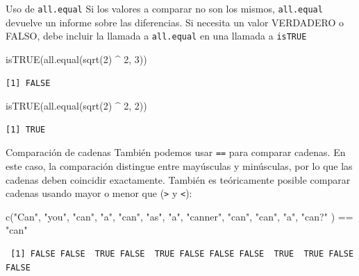 \documentclass[
  ignorenonframetext,
  aspectratio=169,
  spanish,
]{beamer}
\newenvironment{Shaded}{\begin{snugshade}}{\end{snugshade}}
\newcommand{\DecValTok}[1]{\textcolor[rgb]{0.68,0.00,0.00}{#1}}
\newcommand{\FunctionTok}[1]{\textcolor[rgb]{0.28,0.35,0.67}{#1}}
\newcommand{\NormalTok}[1]{\textcolor[rgb]{0.00,0.23,0.31}{#1}}
\newcommand{\SpecialCharTok}[1]{\textcolor[rgb]{0.37,0.37,0.37}{#1}}
\newcommand{\StringTok}[1]{\textcolor[rgb]{0.13,0.47,0.30}{#1}}
\begin{document}
\begin{frame}[fragile]{Uso de \texttt{all.equal}}
\label{uso-de-all.equal}
Si los valores a comparar no son los mismos, \texttt{all.equal} devuelve
un informe sobre las diferencias. Si necesita un valor VERDADERO o
FALSO, debe incluir la llamada a \texttt{all.equal} en una llamada a
\texttt{isTRUE}

\begin{Shaded}
\begin{Highlighting}[]
\FunctionTok{isTRUE}\NormalTok{(}\FunctionTok{all.equal}\NormalTok{(}\FunctionTok{sqrt}\NormalTok{(}\DecValTok{2}\NormalTok{) }\SpecialCharTok{\^{}} \DecValTok{2}\NormalTok{, }\DecValTok{3}\NormalTok{))}
\end{Highlighting}
\end{Shaded}

\begin{verbatim}
[1] FALSE
\end{verbatim}

\begin{Shaded}
\begin{Highlighting}[]
\FunctionTok{isTRUE}\NormalTok{(}\FunctionTok{all.equal}\NormalTok{(}\FunctionTok{sqrt}\NormalTok{(}\DecValTok{2}\NormalTok{) }\SpecialCharTok{\^{}} \DecValTok{2}\NormalTok{, }\DecValTok{2}\NormalTok{))}
\end{Highlighting}
\end{Shaded}

\begin{verbatim}
[1] TRUE
\end{verbatim}
\end{frame}

\begin{frame}[fragile]{Comparación de cadenas}
\label{comparaciuxf3n-de-cadenas}
También podemos usar \texttt{==} para comparar cadenas. En este caso, la
comparación distingue entre mayúsculas y minúsculas, por lo que las
cadenas deben coincidir exactamente. También es teóricamente posible
comparar cadenas usando mayor o menor que (\texttt{\textgreater{}} y
\texttt{\textless{}}):

\begin{Shaded}
\begin{Highlighting}[]
\FunctionTok{c}\NormalTok{(}\StringTok{"Can"}\NormalTok{, }\StringTok{"you"}\NormalTok{, }\StringTok{"can"}\NormalTok{, }\StringTok{"a"}\NormalTok{, }\StringTok{"can"}\NormalTok{, }\StringTok{"as"}\NormalTok{, }\StringTok{"a"}\NormalTok{, }\StringTok{"canner"}\NormalTok{, }\StringTok{"can"}\NormalTok{, }\StringTok{"can"}\NormalTok{, }\StringTok{"a"}\NormalTok{, }\StringTok{"can?"}
\NormalTok{) }\SpecialCharTok{==} \StringTok{"can"}
\end{Highlighting}
\end{Shaded}

\begin{verbatim}
 [1] FALSE FALSE  TRUE FALSE  TRUE FALSE FALSE FALSE  TRUE  TRUE FALSE FALSE
\end{verbatim}
\end{frame}
\end{document}
